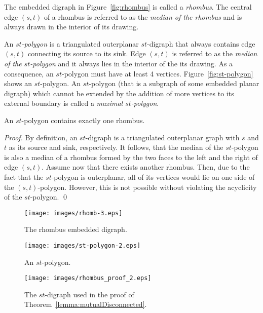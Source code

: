 \documentclass{myllncs-mixalis}
\begin{document}
 The embedded
digraph in Figure~\ref{fig:rhombus} is called a \emph{rhombus}. The
central edge $(s,t)$ of a rhombus is referred to as the \emph{median
of the rhombus} and is always drawn in the interior of its drawing.

 An \emph{$st$-polygon} is a triangulated
outerplanar $st$-digraph that always contains edge $(s,t)$
connecting its source to its sink. Edge $(s,t)$ is referred to as
the \emph{median of the $st$-polygon} and it always lies in the
interior of the its drawing. As a consequence, an $st$-polygon must
have at least 4 vertices. Figure~\ref{fig:st-polygon} shows an
$st$-polygon. An $st$-polygon (that is a subgraph of some embedded
planar digraph) which cannot be extended by the addition of more
vertices to its external boundary is called a \emph{maximal
$st$-polygon}.

\begin{lemma}
\label{lemma:oneRombus} An $st$-polygon contains exactly one
rhombus.
\end{lemma}
\begin{proof}
By   definition, an $st$-digraph is a triangulated outerplanar graph
with $s$ and $t$ as its source and sink, respectively. It follows,
that the median of the $st$-polygon is also a median of a rhombus
formed by the two faces to the left and the right of edge $(s,t)$.
Assume now that there exists another rhombus. Then, due to the fact
that the $st$-polygon is outerplanar, all of its vertices would lie
on one side of the $(s,t)$-polygon. However, this is not possible
without violating the acyclicity of the $st$-polygon.
 \qed
\end{proof}

\begin{figure}[htb]
    \begin{minipage}{0.32\textwidth}
    \centering
    \texttt{[image: images/rhomb-3.eps]}
    \caption{The rhombus embedded digraph.}
    \label{fig:rhombus}
  \end{minipage}
\hfill
    \begin{minipage}{0.32\textwidth}
    \centering
    \texttt{[image: images/st-polygon-2.eps]}
    \caption{An $st$-polygon.}
    \label{fig:st-polygon}
  \end{minipage}
\hfill
    \begin{minipage}{0.32\textwidth}
    \centering
    \texttt{[image: images/rhombus\_proof\_2.eps]}
    \caption{The $st$-digraph used in the proof of Theorem~\ref{lemma:mutualDisconnected}.}
    \label{fig:rhombusProof}
  \end{minipage}
\end{figure}
\end{document}
